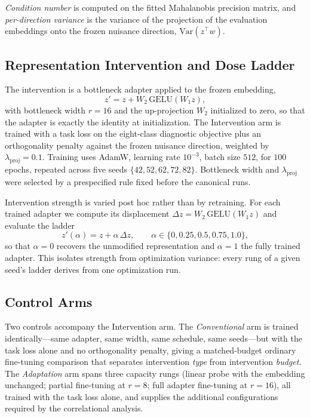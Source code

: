 \emph{Condition number} is computed on the fitted Mahalanobis precision
matrix, and \emph{per-direction variance} is the variance of the projection
of the evaluation embeddings onto the frozen nuisance direction,
$\mathrm{Var}(z^{\top} w)$.

\subsection{Representation Intervention and Dose Ladder}
\label{sec:intervention}

The intervention is a bottleneck adapter applied to the frozen embedding,
\begin{equation}
  z' = z + W_2\,\mathrm{GELU}(W_1 z),
\end{equation}
with bottleneck width $r = 16$ and the up-projection $W_2$ initialized to
zero, so that the adapter is exactly the identity at initialization. The
Intervention arm is trained with a task loss on the eight-class diagnostic
objective plus an orthogonality penalty against the frozen nuisance direction,
weighted by $\lambda_{\mathrm{proj}} = 0.1$. Training uses AdamW, learning
rate $10^{-3}$, batch size $512$, for $100$ epochs, repeated across five
seeds $\{42, 52, 62, 72, 82\}$. Bottleneck width and $\lambda_{\mathrm{proj}}$
were selected by a prespecified rule fixed before the canonical runs.

Intervention strength is varied post hoc rather than by retraining. For each
trained adapter we compute its displacement $\Delta z = W_2\,\mathrm{GELU}(W_1
z)$ and evaluate the ladder
\begin{equation}
  z'(\alpha) = z + \alpha\,\Delta z, \qquad
  \alpha \in \{0, 0.25, 0.5, 0.75, 1.0\},
\end{equation}
so that $\alpha = 0$ recovers the unmodified representation and $\alpha = 1$
the fully trained adapter. This isolates strength from optimization variance:
every rung of a given seed's ladder derives from one optimization run.

\subsection{Control Arms}

Two controls accompany the Intervention arm. The \emph{Conventional} arm is
trained identically---same adapter, same width, same schedule, same
seeds---but with the task loss alone and no orthogonality penalty, giving a
matched-budget ordinary fine-tuning comparison that separates intervention
\emph{type} from intervention \emph{budget}. The \emph{Adaptation} arm spans
three capacity rungs (linear probe with the embedding unchanged; partial
fine-tuning at $r = 8$; full adapter fine-tuning at $r = 16$), all trained
with the task loss alone, and supplies the additional configurations required
by the correlational analysis.

